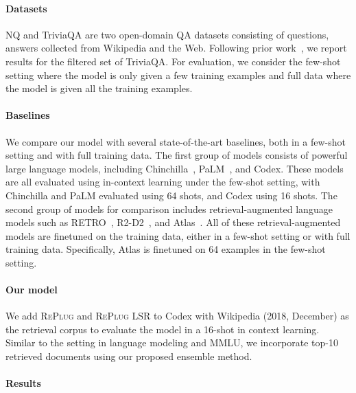 \documentclass[nohyperref]{article}
\newcommand{\model}{\textsc{RePlug}\xspace}
\newcommand{\tunemodel}{\textsc{RePlug LSR}\xspace}
\theoremstyle{plain}
\theoremstyle{definition}
\theoremstyle{remark}
\begin{document}
\paragraph{Datasets}
NQ and TriviaQA are two open-domain QA datasets consisting of questions, answers collected from Wikipedia and the Web. Following prior work~\cite{izacard-grave-2021-leveraging, si2022prompting}, we report results for the filtered set of TriviaQA. For evaluation, we consider the few-shot setting where the model is only given a few training examples and full data where the model is given all the training examples.



\paragraph{Baselines}
We compare our model with several state-of-the-art baselines, both in a few-shot setting and with full training data. The first group of models consists of powerful large language models, including Chinchilla~\cite{chinchilla}, PaLM~\cite{palm}, and Codex. These models are all evaluated using in-context learning under the few-shot setting, with Chinchilla and PaLM evaluated using 64 shots, and Codex using 16 shots. The second group of models for comparison includes retrieval-augmented language models such as RETRO~\cite{borgeaud2021improving}, R2-D2~\cite{fajcik-etal-2021-r2-d2}, and Atlas~\cite{izacard2022few}. All of these retrieval-augmented models are finetuned on the training data, either in a few-shot setting or with full training data. Specifically, Atlas is finetuned on 64 examples in the few-shot setting.


\paragraph{Our model}
We add \model and \tunemodel to Codex with Wikipedia (2018, December) as the retrieval corpus to evaluate the model in a 16-shot in context learning. Similar to the setting in language modeling and MMLU, we incorporate top-10 retrieved documents using our proposed ensemble method. 



\paragraph{Results}
\end{document}
